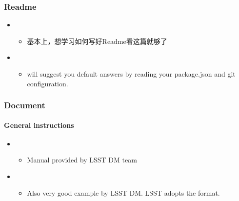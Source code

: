 \documentclass[letterpaper,10pt,english]{sphinxmanual}
\begin{document}
\subsubsection{Readme}
\label{\detokenize{resource/programing/python_write_your_project:readme}}\begin{itemize}
\item {} 
\begin{itemize}
\item {} 
基本上，想学习如何写好Readme看这篇就够了

\end{itemize}

\item {} 
\begin{itemize}
\item {} 
 will suggest you default answers by
reading your package.json and git configuration.

\end{itemize}

\end{itemize}


\subsubsection{Document}
\label{\detokenize{resource/programing/python_write_your_project:document}}

\paragraph{General instructions}
\label{\detokenize{resource/programing/python_write_your_project:general-instructions}}\begin{itemize}
\item {} 
\begin{itemize}
\item {} 
Manual provided by LSST DM team

\end{itemize}

\item {} 
\begin{itemize}
\item {} 
Also very good example by LSST DM. LSST adopts the 
format.

\end{itemize}

\end{itemize}
\end{document}
